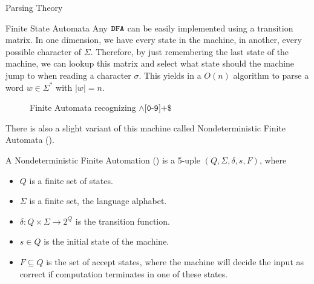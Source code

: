 \begin{section}{Parsing Theory}
\begin{subsection}{Finite State Automata}
Any $\texttt{DFA}$ can be easily implemented using a transition
matrix. In one dimension, we have every state in the machine, in another,
every possible character of $\Sigma$.  Therefore, by just remembering the
last state of the machine, we can lookup this matrix and select what state
should the machine jump to when reading a character $\sigma$. This
yields in a $O(n)$ algorithm to parse a word $w \in \Sigma^*$ with $|w| = n$.


\begin{figure}

\caption{Finite Automata recognizing $\land\texttt{[0-9]+\$}$}
\label{fig:a_automata}
\end{figure}

There is also a slight variant of this machine called Nondeterministic Finite Automata ().

\begin{definition}
A Nondeterministic Finite Automation () is a 5-uple
$(Q, \Sigma, \delta, s, F)$, where
\begin{itemize}

\item $Q$ is a finite set of states.
\item $\Sigma$ is a finite set, the language alphabet.
\item $\delta:Q\times\Sigma \longrightarrow 2^Q$ is the transition function.
\item $s \in Q$ is the initial state of the machine.
\item $F \subseteq Q$ is the set of accept states, where the machine will
decide the input as correct if computation terminates in one of these
states.
\end{itemize}
\end{definition}


\end{subsection}
\end{section}
